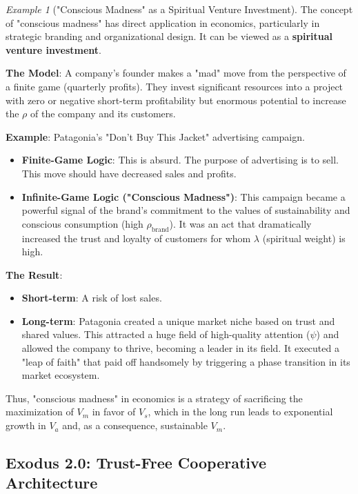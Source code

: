 \documentclass[11pt,a4paper]{article}
\theoremstyle{definition}
\theoremstyle{remark}
\newtheorem{example}{Example}[section]
\begin{document}
\begin{enumerate}
\begin{example}["Conscious Madness" as a Spiritual Venture Investment]
The concept of "conscious madness" has direct application in economics, particularly in strategic branding and organizational design. It can be viewed as a \textbf{spiritual venture investment}.

\textbf{The Model}: A company's founder makes a "mad" move from the perspective of a finite game (quarterly profits). They invest significant resources into a project with zero or negative short-term profitability but enormous potential to increase the $\rho$ of the company and its customers.

\textbf{Example}: Patagonia's "Don't Buy This Jacket" advertising campaign.
\begin{itemize}
    \item \textbf{Finite-Game Logic}: This is absurd. The purpose of advertising is to sell. This move should have decreased sales and profits.
    \item \textbf{Infinite-Game Logic ("Conscious Madness")}: This campaign became a powerful signal of the brand's commitment to the values of sustainability and conscious consumption (high $\rho_{\text{brand}}$). It was an act that dramatically increased the trust and loyalty of customers for whom $\lambda$ (spiritual weight) is high.
\end{itemize}

\textbf{The Result}:
\begin{itemize}
    \item \textbf{Short-term}: A risk of lost sales.
    \item \textbf{Long-term}: Patagonia created a unique market niche based on trust and shared values. This attracted a huge field of high-quality attention ($\psi$) and allowed the company to thrive, becoming a leader in its field. It executed a "leap of faith" that paid off handsomely by triggering a phase transition in its market ecosystem.
\end{itemize}
Thus, "conscious madness" in economics is a strategy of sacrificing the maximization of $V_m$ in favor of $V_s$, which in the long run leads to exponential growth in $V_a$ and, as a consequence, sustainable $V_m$.
\end{example}

\subsection{Exodus 2.0: Trust-Free Cooperative Architecture}


\end{enumerate}
\end{document}
